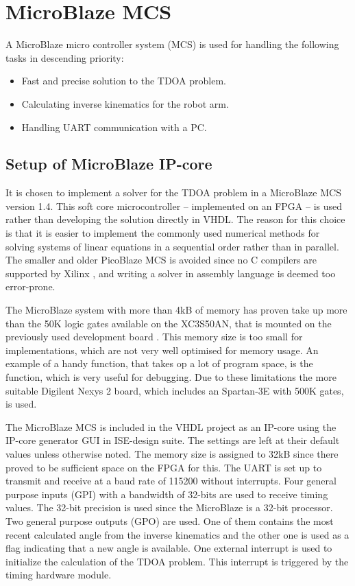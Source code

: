 \section{MicroBlaze MCS}
A MicroBlaze micro controller system (MCS) is used for handling the following tasks in descending priority:
\begin{itemize}
	\item Fast and precise solution to the TDOA problem.
	\item Calculating inverse kinematics for the robot arm.
	\item Handling UART communication with a PC.
\end{itemize}
%
\subsection{Setup of MicroBlaze IP-core}
It is chosen to implement a solver for the TDOA problem in a MicroBlaze MCS version 1.4.
This soft core microcontroller -- implemented on an FPGA -- is used rather than developing the solution directly in VHDL.
The reason for this choice is that it is easier to implement the commonly used numerical methods for solving systems of linear equations in a sequential order rather than in parallel. The smaller and older PicoBlaze MCS is avoided since no C compilers are supported by Xilinx \cite{picoBlazeCompiler}, and writing a solver in assembly language is deemed too error-prone.

The MicroBlaze system with more than 4kB of memory has proven take up more than the 50K logic gates available on the XC3S50AN, that is mounted on the previously used development board \cite{spartan3AN}.
This memory size is too small for implementations, which are not very well optimised for memory usage.
An example of a handy function, that takes op a lot of program space, is the  function, which is very useful for debugging.
Due to these limitations the more suitable Digilent Nexys 2 board, which includes an Spartan-3E with 500K gates, is used.

The MicroBlaze MCS is included in the VHDL project as an IP-core using the IP-core generator GUI in ISE-design suite. The settings are left at their default values unless otherwise noted. The memory size is assigned to 32kB since there proved to be sufficient space on the FPGA for this. The UART is set up to transmit and receive at a baud rate of 115200 without interrupts. Four general purpose inputs (GPI) with a bandwidth of 32-bits are used to receive timing values. The 32-bit precision is used since the MicroBlaze is a 32-bit processor.
Two general purpose outputs (GPO) are used. One of them contains the most recent calculated angle from the inverse kinematics and the other one is used as a flag indicating that a new angle is available.
One external interrupt is used to initialize the calculation of the TDOA problem. This interrupt is triggered by the timing hardware module.
%
